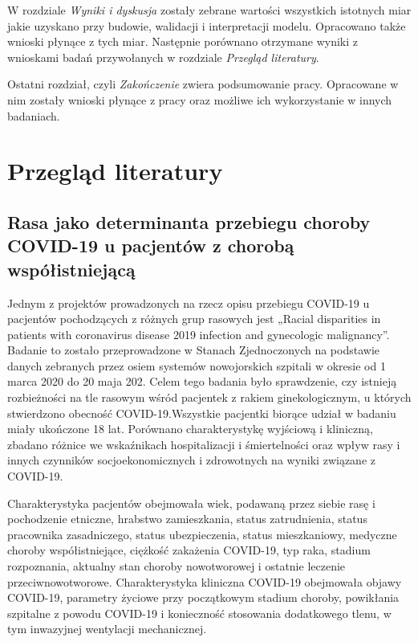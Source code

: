 \documentclass[polish, twoside, 12pt, a4paper]{article}
\theoremstyle{definition}
\theoremstyle{plain}
\theoremstyle{remark}
\begin{document}
W rozdziale \emph{Wyniki i dyskusja} zostały zebrane wartości wszystkich istotnych miar jakie uzyskano przy budowie, walidacji i interpretacji modelu. Opracowano także wnioski płynące z tych miar. Następnie porównano otrzymane wyniki z wnioskami badań przywołanych w rozdziale \emph{Przegląd literatury}.

Ostatni rozdział, czyli \emph{Zakończenie} zwiera podsumowanie pracy. Opracowane w nim zostały wnioski płynące z pracy oraz możliwe ich wykorzystanie w innych badaniach.


\cleardoublepage
\section{Przegląd literatury}
\label{chapter:przeglad-literatury}
\subsection{Rasa jako determinanta przebiegu choroby COVID-19 u pacjentów z chorobą współistniejącą}

Jednym z projektów prowadzonych na rzecz opisu przebiegu COVID-19 u pacjentów pochodzących z różnych grup rasowych jest „Racial disparities in patients with coronavirus disease 2019 infection and gynecologic malignancy”. Badanie to zostało przeprowadzone w Stanach Zjednoczonych na podstawie danych zebranych przez osiem systemów nowojorskich szpitali w okresie od 1 marca 2020 do 20 maja 202. Celem tego badania było sprawdzenie, czy istnieją rozbieżności na tle rasowym wśród pacjentek z rakiem ginekologicznym, u których stwierdzono obecność COVID-19.Wszystkie pacjentki biorące udział w badaniu miały ukończone 18 lat. Porównano charakterystykę wyjściową i kliniczną, zbadano różnice we wskaźnikach hospitalizacji i śmiertelności oraz wpływ rasy i innych czynników socjoekonomicznych i zdrowotnych na wyniki związane z COVID-19. 

Charakterystyka pacjentów obejmowała wiek, podawaną przez siebie rasę i pochodzenie etniczne, hrabstwo zamieszkania, status zatrudnienia, status pracownika zasadniczego, status ubezpieczenia, status mieszkaniowy, medyczne choroby współistniejące, ciężkość zakażenia COVID-19, typ raka, stadium rozpoznania, aktualny stan choroby nowotworowej i ostatnie leczenie przeciwnowotworowe.  Charakterystyka kliniczna COVID-19 obejmowała objawy COVID-19, parametry życiowe przy początkowym stadium choroby, powikłania szpitalne z powodu COVID-19 i konieczność stosowania dodatkowego tlenu, w tym inwazyjnej wentylacji mechanicznej. 
\end{document}
